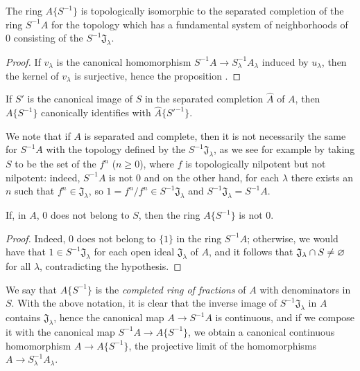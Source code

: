\begin{proposition}[7.6.2]
\label{0.7.6.2}
The ring $A\{S^{-1}\}$ is topologically isomorphic to the separated completion of the ring
$S^{-1}A$ for the topology which has a fundamental system of neighborhoods of $0$ consisting of
the $S^{-1}\mathfrak{J}_\lambda$.
\end{proposition}

\begin{proof}
If $v_\lambda$ is the canonical homomorphism $S^{-1}A\to S_\lambda^{-1}A_\lambda$ induced
by $u_\lambda$, then the kernel of $v_\lambda$ is surjective, hence the proposition .
\end{proof}

\begin{corollary}[7.6.3]
\label{0.7.6.3}
If $S'$ is the canonical image of $S$ in the separated completion $\widehat{A}$ of $A$, then
$A\{S^{-1}\}$ canonically identifies with $\widehat{A}\{{S'}^{-1}\}$.
\end{corollary}

We note that if $A$ is separated and complete, then it is not necessarily the same for
$S^{-1}A$ with the topology defined by the $S^{-1}\mathfrak{J}_\lambda$, as we see for example
by taking $S$ to be the set of the $f^n$ ($n\geq 0$), where $f$ is topologically nilpotent
but not nilpotent: indeed, $S^{-1}A$ is not $0$ and on the other hand, for each $\lambda$ there
exists an $n$ such that $f^n\in\mathfrak{J}_\lambda$, so $1=f^n/f^n\in S^{-1}\mathfrak{J}_\lambda$
and $S^{-1}\mathfrak{J}_\lambda=S^{-1}A$.

\begin{corollary}[7.6.4]
\label{0.7.6.4}
If, in $A$, $0$ does not belong to $S$, then the ring $A\{S^{-1}\}$ is not $0$.
\end{corollary}

\begin{proof}
Indeed, $0$ does not belong to $\{1\}$ in the ring $S^{-1}A$; otherwise, we would have that
$1\in S^{-1}\mathfrak{J}_\lambda$ for each open ideal $\mathfrak{J}_\lambda$ of $A$, and it
follows that $\mathfrak{J}_\lambda\cap S\neq\varnothing$ for all $\lambda$, contradicting the
hypothesis.
\end{proof}

\begin{env}[7.6.5]
\label{0.7.6.5}
We say that $A\{S^{-1}\}$ is the \emph{completed ring of fractions} of $A$ with denominators
in $S$. With the above notation, it is clear that the inverse image of $S^{-1}\mathfrak{J}_\lambda$
in $A$ contains $\mathfrak{J}_\lambda$, hence the canonical map $A\to S^{-1}A$ is continuous, and if
we compose it with the canonical map $S^{-1}A\to A\{S^{-1}\}$, we obtain a canonical continuous
homomorphism $A\to A\{S^{-1}\}$, the projective limit of the homomorphisms
$A\to S_\lambda^{-1}A_\lambda$.
\end{env}

